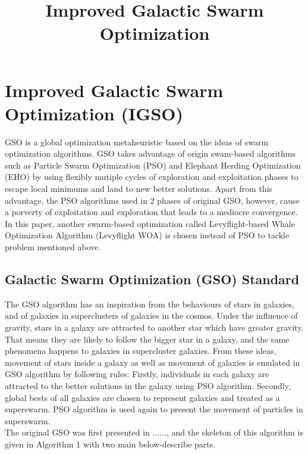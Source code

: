\documentclass[a4paper]{article}
\begin{document}
 

\title{Improved Galactic Swarm Optimization}
\maketitle
\noindent

\section{Improved Galactic Swarm Optimization (IGSO)}
GSO is a global optimization metaheuristic based on the ideas of swarm optimization algorithms. GSO takes advantage of origin swam-based algorithms such as Particle Swarm Optimization (PSO) and Elephant Herding Optimization (EHO) by using flexibly mutiple cycles of exploration and exploitation phases to escape local minimums and land to new better solutions. Apart from   this advantage, the PSO algorithms used in 2 phases of original GSO, however, cause a porverty of exploitation and exploration that leads to a mediocre convergence. In this paper, another swarm-based optimization called Levyflight-based Whale Optimization Algorithm (Levyflight WOA) is chosen instead of PSO to tackle problem mentioned above. 
\subsection{Galactic Swarm Optimization (GSO) Standard}
The GSO algorithm has an inspiration from the behaviours of stars in galaxies, and of galaxies in superclusters of galaxies in the cosmos. Under the influence of gravity, stars in a galaxy are attracted to another star which have greater gravity. That means they are likely to follow the bigger star in a galaxy, and the same phenomena happens to galaxies in supercluster galaxies. From these ideas, movement of stars inside a galaxy as well as movement of galaxies is emulated in GSO algorithm by following rules: Firstly, individuals in each galaxy are attracted to the better solutions in the galaxy using PSO algorithm. Secondly, global bests of all galaxies are chosen to represent galaxies and treated as a superswarm. PSO algorithm is used again to present the movement of particles in superswarm. \\
The original GSO was first presented in ......, and the skeleton of this algorithm is given in Algorithm 1 with two main below-describe parts.  \\
\end{document}
